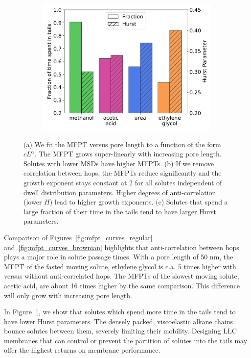 \documentclass{article}
\begin{document}
\begin{figure}
\begin{subfigure}{0.325\textwidth}
  \end{subfigure}
  \begin{subfigure}{0.325\textwidth}
  \includegraphics[width=\textwidth]{frac_pore.pdf}  %
  \caption{}\label{fig:frac_pore}
  \end{subfigure}
  \caption{(a) We fit the MFPT versus pore length to a function of the form $cL^{\alpha}$. 
  The MFPT grows super-linearly with increasing pore length. Solutes with lower MSDs have
  higher MFPTs. (b) If we remove correlation between hops, the MFPTs reduce significantly
  and the growth exponent stays constant at 2 for all solutes independent of dwell
  distribution parameters. Higher degrees of anti-correlation (lower $H$) lead to higher
  growth exponents. (c) Solutes that spend a large fraction of their time in the tails tend
  to have larger Hurst parameters.}\label{fig:mfpt_curves}
  \end{figure}
  
  Comparison of Figures~\ref{fig:mfpt_curves_regular} and~\ref{fig:mfpt_curves_brownian}
  highlights that anti-correlation between hops plays a major role in solute passage times.
  With a pore length of 50 nm, the MFPT of the fasted moving solute, ethylene glycol is 
  c.a. 5 times higher with versus without anti-correlated hops. The MFPTs of the slowest
  moving solute, acetic acid, are about 16 times higher by the same comparison. This 
  difference will only grow with increasing pore length. 
  
  In Figure~\ref{fig:frac_pore}, we show that solutes which spend more time in the tails
  tend to have lower Hurst parameters. The densely packed, viscoelastic alkane chains 
  bounce solutes between them, severely limiting their mobility. Designing LLC membranes
  that can control or prevent the partition of solutes into the tails may offer the highest
  returns on membrane performance.
  
\end{document}

